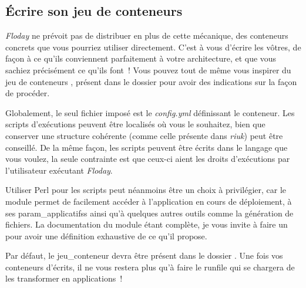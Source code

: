 \subsection{Écrire son jeu de conteneurs}

\emph{Floday} ne prévoit pas de distribuer en plus de cette mécanique, des conteneurs concrets que vous pourriez utiliser directement.
C'est à vous d'écrire les vôtres, de façon à ce qu'ils conviennent parfaitement à votre architecture, et que vous sachiez précisément ce qu'ils font~!
Vous pouvez tout de même vous inspirer du jeu de conteneurs , présent dans le dossier  pour avoir des indications sur la façon de procéder.

Globalement, le seul fichier imposé est le \emph{config.yml} définissant le conteneur.
Les scripts d'exécutions peuvent être localisés où vous le souhaitez, bien que conserver une structure cohérente (comme celle présente dans \emph{riuk}) peut être conseillé.
De la même façon, les scripts peuvent être écrits dans le langage que vous voulez, la seule contrainte est que ceux-ci aient les droits d'exécutions par l'utilisateur exécutant \emph{Floday}.

Utiliser Perl pour les scripts peut néanmoins être un choix à privilégier, car le module  permet de facilement accéder à l'\gls{application} en cours de déploiement, à ses \glspl{param_applicatifs} ainsi qu'à quelques autres outils comme la génération de fichiers.
La documentation du module étant complète, je vous invite à faire un  pour avoir une définition exhaustive de ce qu'il propose.

Par défaut, le \gls{jeu_conteneur} devra être présent dans le dossier .
Une fois vos conteneurs d'écrits, il ne vous restera plus qu'à faire le \gls{runfile} qui se chargera de les transformer en applications~!

